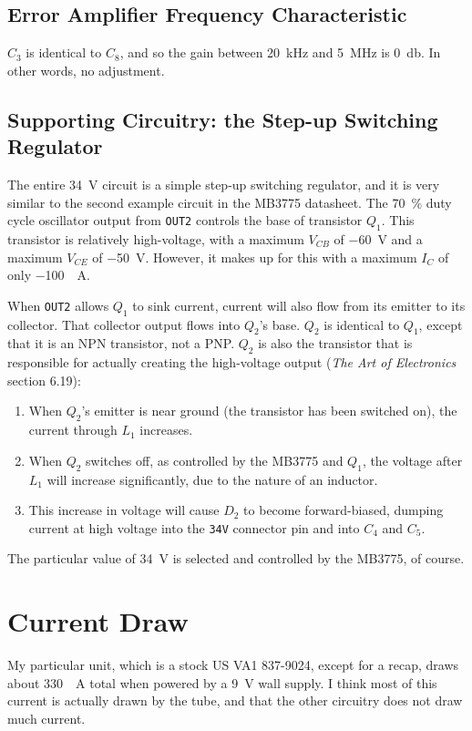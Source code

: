 \documentclass{article}
\newcommand{\chippin}{\texttt}
\begin{document}
\subsection{Error Amplifier Frequency Characteristic}
$C_3$ is identical to $C_8$, and so the gain between
\qty{20}{\kilo\hertz} and \qty{5}{\mega\hertz} is
\qty{0}{\decibel}. In other words, no adjustment.

\subsection{Supporting Circuitry: the Step-up Switching Regulator}
The entire \qty{34}{\volt} circuit is a simple step-up switching
regulator, and it is very similar to the second example circuit in the
MB3775 datasheet. The \qty{70}{\%} duty cycle oscillator output from
\chippin{OUT2} controls the base of transistor $Q_1$. This transistor
is relatively high-voltage, with a maximum $V_{CB}$ of
\qty{-60}{\volt} and a maximum $V_{CE}$ of \qty{-50}{\volt}. However,
it makes up for this with a maximum $I_C$ of only
\qty{-100}{\milli{}A}.

When \chippin{OUT2} allows $Q_1$ to sink current, current will also
flow from its emitter to its collector. That collector output flows
into $Q_2$'s base. $Q_2$ is identical to $Q_1$, except that it is an
NPN transistor, not a PNP. $Q_2$ is also the transistor that is
responsible for actually creating the high-voltage output (\textit{The
Art of Electronics} section 6.19):

\begin{enumerate}
\item When $Q_2$'s emitter is near ground (the transistor has been
  switched on), the current through $L_1$ increases. 
\item When $Q_2$ switches off, as controlled by the MB3775 and $Q_1$,
  the voltage after $L_1$ will increase significantly, due to the
  nature of an inductor.
\item This increase in voltage will cause $D_2$ to become
  forward-biased, dumping current at high voltage into the
  \chippin{34V} connector pin and into $C_4$ and $C_5$.
\end{enumerate}

The particular value of \qty{34}{\volt} is selected and controlled by
the MB3775, of course.

\section{Current Draw}
My particular unit, which is a stock US VA1 837-9024, except for a
recap, draws about \qty{330}{\milli{}A} total when powered by a
\qty{9}{\volt} wall supply. I think most of this current is actually
drawn by the tube, and that the other circuitry does not draw much
current.
\end{document}
